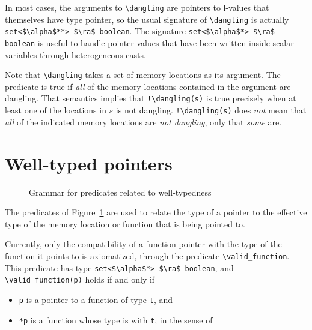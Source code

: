 In most cases, the arguments to \lstinline|\dangling| are pointers to
l-values that themselves have type pointer, so the usual signature
of \lstinline|\dangling| is actually
\lstinline|set<$\alpha$**> $\ra$ boolean|.
The signature \lstinline|set<$\alpha$*> $\ra$ boolean| is useful to handle
pointer values that have been written inside scalar variables through
heterogeneous casts.

Note that \lstinline|\dangling| takes a set of memory locations as its argument.
The predicate is true if \emph{all} of the memory locations contained in the argument are dangling. That
semantics implies that \lstinline|!\dangling(s)| is true precisely when at least one
of the locations in $s$ is not dangling. \lstinline|!\dangling(s)| does \emph{not} mean that
\emph{all} of the indicated memory locations are \emph{not dangling}, only that \emph{some} are.

\section{Well-typed pointers}
\label{sec:welltyped}
\experimental
{}

\begin{figure}[htp]
  \begin{cadre}
      
    \end{cadre}
  \caption{Grammar for predicates related to well-typedness }
\label{fig:gram:welltyped}
\end{figure}

The predicates of Figure~\ref{fig:gram:welltyped} are used to relate
the type of a pointer to the effective type of the memory location or function
that is being pointed to.

Currently, only the compatibility of a function pointer with the type of
the function it points to is axiomatized, through the predicate
\lstinline|\valid_function|. This predicate has type
\lstinline|set<$\alpha$*> $\ra$ boolean|,
and \lstinline|\valid_function(p)| holds if and only if
\begin{itemize}
\item \lstinline|p| is a pointer to a function of type \lstinline|t|, and
\item \lstinline|*p| is a function whose type is
\iftoggle{isCPP}{\emph{layout-compatible}}{\emph{compatible}}
  with \lstinline|t|, in the sense of
\iftoggle{isCPP}
{\cite{C++-2011} \S3.9 [basic.types], alinea 11}
{\cite[\S6.2.7]{standardc99}}
\end{itemize}

